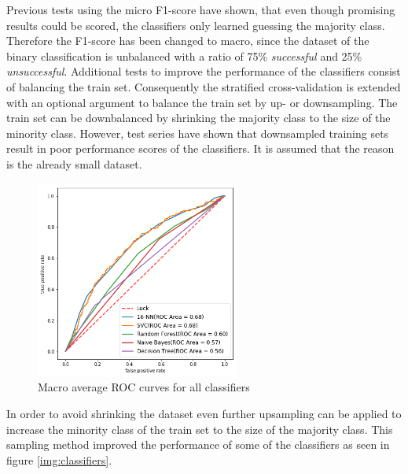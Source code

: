 Previous tests using the micro F1-score have shown, that even though promising results could be scored, the classifiers only learned guessing the majority class. Therefore the F1-score has been changed to macro,
 since the dataset of the binary classification is unbalanced with a ratio of 75\% \textit{successful} and 25\% \textit{unsuccessful}.
Additional tests to improve the performance of the classifiers consist of balancing the train set.
Consequently the stratified cross-validation is extended with an optional argument to balance the train set by up- or downsampling.
The train set can be downbalanced by shrinking the majority class to the size of the minority class. However, test series have shown that downsampled training sets result in poor performance scores of the classifiers. It is assumed that the reason is the already small dataset.
\begin{figure}
	\includegraphics[width=0.6\textwidth]{images/roc.png}
	\caption{Macro average ROC curves for all classifiers}
	\label{img:roc}
\end{figure}
In order to avoid shrinking the dataset even further upsampling can be applied to increase the minority class of the train set to the size of the majority class. This sampling method improved the performance of some of the classifiers as seen in figure \ref{img:classifiers}.

